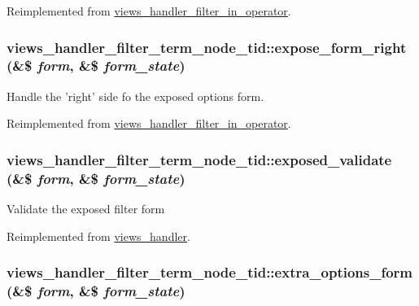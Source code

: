 Reimplemented from \hyperlink{classviews__handler__filter__in__operator_2c17bde9b5cb3498d31786ba888d545c}{views\_\-handler\_\-filter\_\-in\_\-operator}.\hypertarget{classviews__handler__filter__term__node__tid_6a3523271cc4bd41ae944dd38bf24b37}{
\subsubsection[{expose\_\-form\_\-right}]{\setlength{\rightskip}{0pt plus 5cm}views\_\-handler\_\-filter\_\-term\_\-node\_\-tid::expose\_\-form\_\-right (\&\$ {\em form}, \/  \&\$ {\em form\_\-state})}}
\label{classviews__handler__filter__term__node__tid_6a3523271cc4bd41ae944dd38bf24b37}


Handle the 'right' side fo the exposed options form. 

Reimplemented from \hyperlink{classviews__handler__filter__in__operator_512acf0d0d577f3c87882d08e9808880}{views\_\-handler\_\-filter\_\-in\_\-operator}.\hypertarget{classviews__handler__filter__term__node__tid_b0c4583fea802e86c84fabafc4768074}{
\subsubsection[{exposed\_\-validate}]{\setlength{\rightskip}{0pt plus 5cm}views\_\-handler\_\-filter\_\-term\_\-node\_\-tid::exposed\_\-validate (\&\$ {\em form}, \/  \&\$ {\em form\_\-state})}}
\label{classviews__handler__filter__term__node__tid_b0c4583fea802e86c84fabafc4768074}


Validate the exposed filter form 

Reimplemented from \hyperlink{classviews__handler_2dd536754e4764cc82ffe7c864f54b16}{views\_\-handler}.\hypertarget{classviews__handler__filter__term__node__tid_df599d1bef08003b1b734dfd397030a6}{
\subsubsection[{extra\_\-options\_\-form}]{\setlength{\rightskip}{0pt plus 5cm}views\_\-handler\_\-filter\_\-term\_\-node\_\-tid::extra\_\-options\_\-form (\&\$ {\em form}, \/  \&\$ {\em form\_\-state})}}
\label{classviews__handler__filter__term__node__tid_df599d1bef08003b1b734dfd397030a6}


